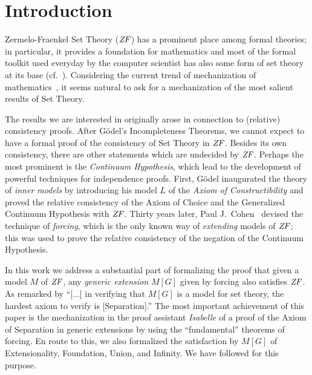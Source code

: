 \section{Introduction}
Zermelo-Fraenkel Set Theory ($\mathit{ZF}$) has a prominent place among formal
theories; in particular, it provides a foundation for mathematics and
most of the formal toolkit used everyday by the computer scientist has
also some form of set theory at its base
(cf.~\cite{paulson1995set}). Considering the current trend 
of mechanization of mathematics~\cite{avigad2018mechanization}, it
seems natural to ask for a mechanization of the most salient results
of Set Theory.

The results we are interested in originally arose in connection to
(relative) consistency proofs.
After G\"odel's Incompleteness Theorems, we cannot expect to have a
formal proof of the consistency of Set Theory in $\mathit{ZF}$. Besides its own
consistency, there are other statements which are undecided by $\mathit{ZF}$.
Perhaps the most prominent  is the
\emph{Continuum Hypothesis}, which lead to the development of powerful
techniques for independence proofs. First, G\"odel inaugurated the
theory of \emph{inner models} by introducing his model $L$ of
the \emph{Axiom of Constructibility} \cite{godel-L} and proved the
relative consistency of the Axiom of Choice and the Generalized
Continuum Hypothesis with $\mathit{ZF}$. Thirty years later, Paul
J.~Cohen~\cite{Cohen-CH-PNAS} devised the technique of \emph{forcing},
which is the only known way of \emph{extending} models of $\mathit{ZF}$; this
was used to prove the relative consistency of the 
negation of the Continuum Hypothesis. 

In this work we address a substantial part of formalizing the proof
that given a model $M$ of $\mathit{ZF}$, any \emph{generic extension} $M[G]$
given by forcing also satisfies $\mathit{ZF}$. As remarked by
\citet[][p.250]{kunen2011set} \enquote{[...] in verifying that $M[G]$
  is a model for set theory, the hardest axiom to verify is
  [Separation].}  
The most important achievement of this paper is the
mechanization in the proof assistant \emph{Isabelle} of a proof of the
Axiom of Separation in 
generic extensions by using the ``fundamental'' theorems of forcing.
En route
to this, we also formalized the satisfaction by $M[G]$ of
Extensionality, Foundation, Union, and Infinity. %
We have  followed \cite{kunen2011set} for this purpose.

